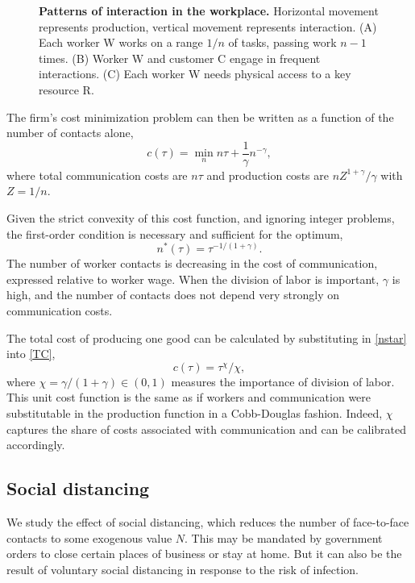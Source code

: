 \begin{figure}[!h]
\plos{}

\caption{{\bf Patterns of interaction in the workplace.}
Horizontal movement represents production, vertical movement represents interaction. (A) Each worker W works on a range $1/n$ of tasks, passing work $n-1$ times. (B) Worker W and customer C engage in frequent interactions. (C) Each worker W needs physical access to a key resource R.}
\label{fig1}
\end{figure}

The firm's cost minimization problem can then be written as a function of the number of contacts alone,
\begin{equation}\label{TC}
	c(\tau) = \min_n n\tau + \frac 1\gamma n^{-\gamma},
\end{equation}
where total communication costs are $n\tau$ and production costs are $n Z^{1+\gamma}/\gamma$ with $Z=1/n$.

Given the strict convexity of this cost function, and ignoring integer problems, the first-order condition is necessary and sufficient for the optimum,
\begin{equation}\label{nstar}
	n^*(\tau) = \tau^{-1/(1+\gamma)}.
\end{equation}
The number of worker contacts is decreasing in the cost of communication, expressed relative to worker wage. When the division of labor is important, $\gamma$ is high, and the number of contacts does not depend very strongly on communication costs.

The total cost of producing one good can be calculated by substituting in \eqref{nstar} into \eqref{TC},
\begin{equation}\label{cost}
	c(\tau) = \tau^{\chi}/\chi,
\end{equation}
where $\chi=\gamma/(1+\gamma)\in(0,1)$ measures the importance of division of labor. This unit cost function is the same as if workers and communication were substitutable in the production function in a Cobb-Douglas fashion. Indeed, $\chi$ captures the share of costs associated with communication and can be calibrated accordingly.

\subsection*{Social distancing}

We study the effect of social distancing, which reduces the number of face-to-face contacts to some exogenous value $N$. This may be mandated by government orders to close certain places of business or stay at home. But it can also be the result of voluntary social distancing in response to the risk of infection. 

